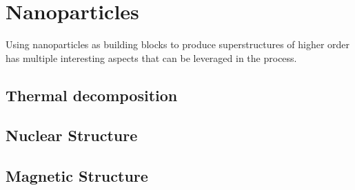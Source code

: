 \documentclass[\main/dresen_thesis.tex]{subfiles}
\begin{document}
\chapter{Nanoparticles}\label{ch:nanoparticles}
Using nanoparticles as building blocks to produce superstructures of higher order has multiple interesting aspects that can be leveraged in the process.

\section{Thermal decomposition}

\section{Nuclear Structure}

\section{Magnetic Structure}
\end{document}

